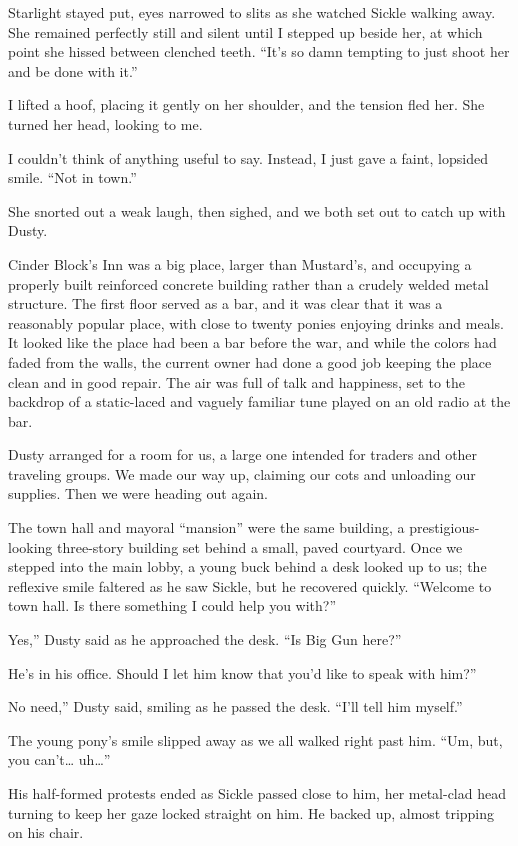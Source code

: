 Starlight stayed put, eyes narrowed to slits as she watched Sickle walking away. She remained perfectly still and silent until I stepped up beside her, at which point she hissed between clenched teeth. “It’s so damn tempting to just shoot her and be done with it.”

I lifted a hoof, placing it gently on her shoulder, and the tension fled her. She turned her head, looking to me.

I couldn’t think of anything useful to say. Instead, I just gave a faint, lopsided smile. “Not in town.”

She snorted out a weak laugh, then sighed, and we both set out to catch up with Dusty.

{\br}%
Cinder Block’s Inn was a big place, larger than Mustard’s, and occupying a properly built reinforced concrete building rather than a crudely welded metal structure. The first floor served as a bar, and it was clear that it was a reasonably popular place, with close to twenty ponies enjoying drinks and meals. It looked like the place had been a bar before the war, and while the colors had faded from the walls, the current owner had done a good job keeping the place clean and in good repair. The air was full of talk and happiness, set to the backdrop of a static-laced and vaguely familiar tune played on an old radio at the bar.

Dusty arranged for a room for us, a large one intended for traders and other traveling groups. We made our way up, claiming our cots and unloading our supplies. Then we were heading out again.

The town hall and mayoral “mansion” were the same building, a prestigious-looking three-story building set behind a small, paved courtyard. Once we stepped into the main lobby, a young buck behind a desk looked up to us; the reflexive smile faltered as he saw Sickle, but he recovered quickly. “Welcome to town hall. Is there something I could help you with?”

\leavevmode{}Yes,” Dusty said as he approached the desk. “Is Big Gun here?”

\leavevmode{}He’s in his office. Should I let him know that you’d like to speak with him?”

\leavevmode{}No need,” Dusty said, smiling as he passed the desk. “I’ll tell him myself.”

The young pony’s smile slipped away as we all walked right past him. “Um, but, you can’t… uh…”

His half-formed protests ended as Sickle passed close to him, her metal-clad head turning to keep her gaze locked straight on him. He backed up, almost tripping on his chair.

